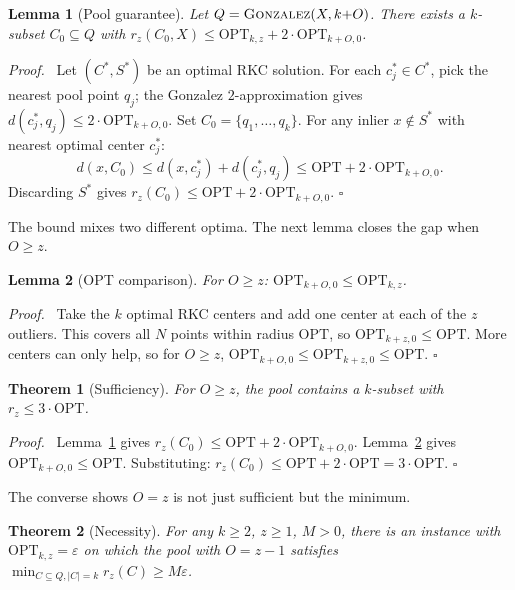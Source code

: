 \documentclass{siam}
\newtheorem{theorem}{Theorem}
\newtheorem{lemma}{Lemma}
\newenvironment{proof}[1][Proof]{\noindent\textit{#1.}\ }%
    {\hfill$\square$\par\medskip}%
\newcommand{\OPT}{\mathrm{OPT}}
\newcommand{\rz}{r_z}
\begin{document}
\begin{lemma}[Pool guarantee]
\label{lem:pool}
Let $Q=\textsc{Gonzalez}(X,k{+}O)$. There exists a $k$-subset
$C_0\subseteq Q$ with
$\rz(C_0,X)\le \OPT_{k,z} + 2\cdot\OPT_{k+O,0}$.
\end{lemma}

\begin{proof}
Let $(C^{*},S^{*})$ be an optimal RKC solution. For each
$c^{*}_j\in C^{*}$, pick the nearest pool point $q_j$; the Gonzalez
$2$-approximation gives $d(c^{*}_j,q_j)\le 2\cdot\OPT_{k+O,0}$. Set
$C_0=\{q_1,\dots,q_k\}$. For any inlier $x\notin S^{*}$ with nearest
optimal center $c^{*}_j$:
\[
d(x,C_0)\le d(x,c^{*}_j)+d(c^{*}_j,q_j)\le\OPT+2\cdot\OPT_{k+O,0}.
\]
Discarding $S^{*}$ gives $\rz(C_0)\le\OPT+2\cdot\OPT_{k+O,0}$.
\end{proof}

The bound mixes two different optima. The next lemma closes the gap
when $O\ge z$.

\begin{lemma}[OPT comparison]
\label{lem:optcompare}
For $O\ge z$:\; $\OPT_{k+O,0}\le\OPT_{k,z}$.
\end{lemma}

\begin{proof}
Take the $k$ optimal RKC centers and add one center at each of the
$z$ outliers. This covers all $N$ points within radius $\OPT$, so
$\OPT_{k+z,0}\le\OPT$. More centers can only help, so for $O\ge z$,
$\OPT_{k+O,0}\le\OPT_{k+z,0}\le\OPT$.
\end{proof}

\begin{theorem}[Sufficiency]
\label{thm:sufficiency}
For $O\ge z$, the pool contains a $k$-subset with $\rz\le 3\cdot\OPT$.
\end{theorem}

\begin{proof}
Lemma~\ref{lem:pool} gives $\rz(C_0)\le\OPT+2\cdot\OPT_{k+O,0}$.
Lemma~\ref{lem:optcompare} gives $\OPT_{k+O,0}\le\OPT$.
Substituting: $\rz(C_0)\le\OPT+2\cdot\OPT=3\cdot\OPT$.
\end{proof}

The converse shows $O=z$ is not just sufficient but the minimum.

\begin{theorem}[Necessity]
\label{thm:necessity}
For any $k\ge 2$, $z\ge 1$, $M>0$, there is an instance with
$\OPT_{k,z}=\varepsilon$ on which the pool with $O=z-1$ satisfies
$\min_{C\subseteq Q,|C|=k}\rz(C)\ge M\varepsilon$.
\end{theorem}
\end{document}
